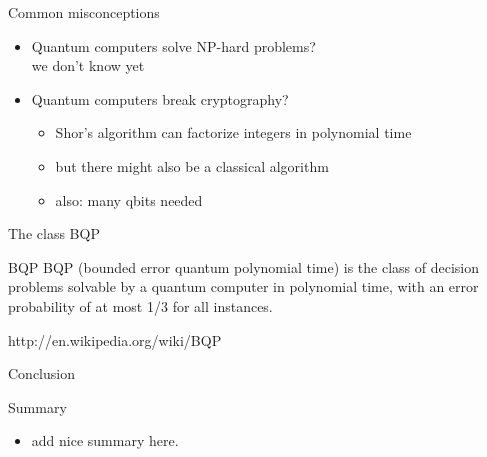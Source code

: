 \documentclass[c]{beamer}
\begin{document}

\begin{frame}{Common misconceptions}
\begin{itemize}
\item Quantum computers solve NP-hard problems? \\
 we don't know yet
\item Quantum computers break cryptography? \\
\begin{itemize}
\item Shor's algorithm can factorize integers in polynomial time
\item but there might also be a classical algorithm
\item also: many qbits needed
\end{itemize}
\end{itemize}
\end{frame}

\begin{frame}{The class BQP}
	\begin{block}{BQP}
		BQP (bounded error quantum polynomial time) is the class of decision problems solvable by a quantum computer in polynomial time, with an error probability of at most 1/3 for all instances.
	\end{block}
	http://en.wikipedia.org/wiki/BQP
\end{frame}

\begin{frame}{Conclusion}
	\begin{block}{Summary}
		\begin{itemize}
			\item add nice summary here.
		\end{itemize}
	\end{block}
\end{frame}
\end{document}
